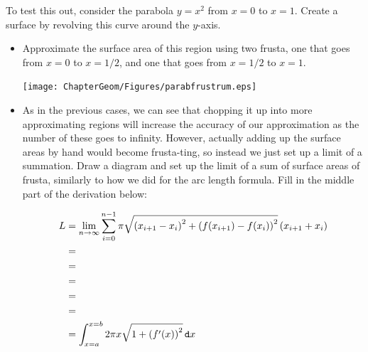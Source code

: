 \begin{exercise}{ \Coffeecup \Coffeecup \Coffeecup}
To test this out, consider the parabola $y=x^2$ from $x=0$ to $x=1$.  Create a surface by revolving this curve around the $y$-axis.  
\begin{itemize}
\item Approximate the surface area of this region using two frusta, one that goes from $x=0$ to $x=1/2$, and one that goes from $x=1/2$ to $x=1$.

	\begin{center}
		\texttt{[image: ChapterGeom/Figures/parabfrustrum.eps]}
	\end{center} 


\item As in the previous cases, we can see that chopping it up into more approximating regions will increase the accuracy of our approximation as the number of these goes to infinity.  However, actually adding up the surface areas by hand would become frusta-ting, so instead we just set up a limit of a summation.  Draw a diagram and set up the limit of a sum of surface areas of frusta, similarly to how we did for the arc length formula.  Fill in the middle part of the derivation below:


\begin{align*}
L&=\lim_{n\rightarrow \infty}\sum_{i=0}^{n-1} \pi\sqrt{\left(x_{i+1}-x_i\right)^2+\left(f(x_{i+1})-f(x_i)\right)^2}\left(x_{i+1}+x_{i} \right)  \\
&=  \\
&= \\
&= \\
&= \\
&= \\
&=\int_{x=a}^{x=b} 2 \pi x \sqrt{1+\left(f'(x)\right)^2} \mathop{}\!\mathtt{d} x \\
\end{align*}


\end{itemize}
\end{exercise}
